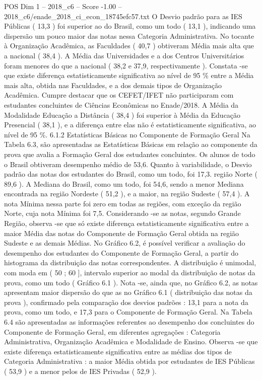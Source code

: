 \begin{textsample}{POS Dim 1 – 2018\_c6 – Score -1.00 – 2018\_c6/enade\_2018\_ci\_econ\_18745efc57.txt}
O Desvio padrão para as IES Públicas ( 13,3 ) foi superior ao do Brasil, como um todo ( 13,1 ), indicando uma dispersão um pouco maior das notas nessa Categoria Administrativa.
No tocante à Organização Acadêmica, as Faculdades ( 40,7 ) obtiveram Média mais alta que a nacional ( 38,4 ).
A Média das Universidades e a dos Centros Universitários foram menores do que a nacional ( 38,2 e 37,9, respectivamente ).
Constata -se que existe diferença estatisticamente significativa ao nível de 95 \% entre a Média mais alta, obtida nas Faculdades, e a dos demais tipos de Organização Acadêmica.
Cumpre destacar que os CEFET/IFET não participaram com estudantes concluintes de Ciências Econômicas no Enade/2018.
A Média da Modalidade Educação a Distância ( 38,4 ) foi superior à Média da Educação Presencial ( 38,1 ), e a diferença entre elas não é estatisticamente significativa, ao nível de 95 \%. 6.1.2 Estatísticas Básicas no Componente de Formação Geral Na Tabela 6.3, são apresentadas as Estatísticas Básicas em relação ao componente da prova que avalia a Formação Geral dos estudantes concluintes.
Os alunos de todo o Brasil obtiveram desempenho médio de 53,6.
Quanto à variabilidade, o Desvio padrão das notas dos estudantes do Brasil, como um todo, foi 17,3. região Norte ( 89,6 ).
A Mediana do Brasil, como um todo, foi 54,6, sendo a menor Mediana encontrada na região Nordeste ( 51,2 ), e a maior, na região Sudeste ( 57,4 ).
A nota Mínima nessa parte foi zero em todas as regiões, com exceção da região Norte, cuja nota Mínima foi 7,5.
Considerando -se as notas, segundo Grande Região, observa -se que só existe diferença estatisticamente significativa entre a maior Média das notas do Componente de Formação Geral obtida na região Sudeste e as demais Médias.
No Gráfico 6.2, é possível verificar a avaliação do desempenho dos estudantes do Componente de Formação Geral, a partir do histograma da distribuição das notas correspondentes.
A distribuição é unimodal, com moda em ( 50 ; 60 ], intervalo superior ao modal da distribuição de notas da prova, como um todo ( Gráfico 6.1 ).
Nota -se, ainda que, no Gráfico 6.2, as notas apresentam maior dispersão do que as no Gráfico 6.1 ( distribuição das notas da prova ), confirmado pela comparação dos desvios padrões : 13,1 para a nota da prova, como um todo, e 17,3 para o Componente de Formação Geral.
Na Tabela 6.4 são apresentadas as informações referentes ao desempenho dos concluintes do Componente de Formação Geral, em diferentes agregações : Categoria Administrativa, Organização Acadêmica e Modalidade de Ensino.
Observa -se que existe diferença estatisticamente significativa entre as médias dos tipos de Categoria Administrativa : a maior Média obtida por estudantes de IES Públicas ( 53,9 ) e a menor pelos de IES Privadas ( 52,9 ).

\end{textsample}
